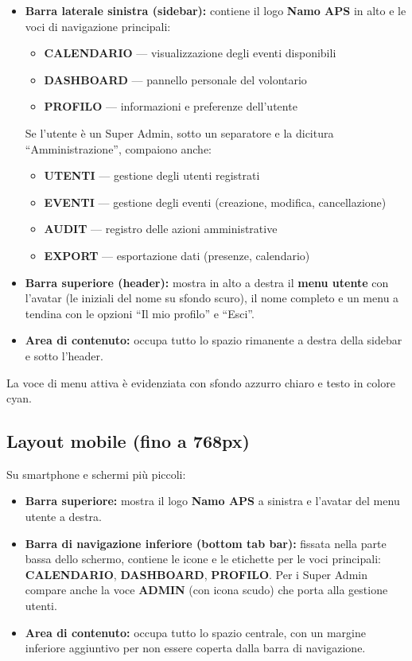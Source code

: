 \documentclass[a4paper,11pt,oneside]{book}
\newcommand{\namoaps}{\textbf{Namo APS}}
\newcommand{\menuitem}[1]{\textsf{\textbf{#1}}}
\begin{document}
\begin{itemize}[leftmargin=1.5em]
  \item \textbf{Barra laterale sinistra (sidebar):} contiene il logo \namoaps{} in alto e le voci di navigazione principali:
    \begin{itemize}
      \item \menuitem{CALENDARIO} --- visualizzazione degli eventi disponibili
      \item \menuitem{DASHBOARD} --- pannello personale del volontario
      \item \menuitem{PROFILO} --- informazioni e preferenze dell'utente
    \end{itemize}
    Se l'utente \`e un Super Admin, sotto un separatore e la dicitura ``Amministrazione'', compaiono anche:
    \begin{itemize}
      \item \menuitem{UTENTI} --- gestione degli utenti registrati
      \item \menuitem{EVENTI} --- gestione degli eventi (creazione, modifica, cancellazione)
      \item \menuitem{AUDIT} --- registro delle azioni amministrative
      \item \menuitem{EXPORT} --- esportazione dati (presenze, calendario)
    \end{itemize}
  \item \textbf{Barra superiore (header):} mostra in alto a destra il \textbf{menu utente} con l'avatar (le iniziali del nome su sfondo scuro), il nome completo e un menu a tendina con le opzioni ``Il mio profilo'' e ``Esci''.
  \item \textbf{Area di contenuto:} occupa tutto lo spazio rimanente a destra della sidebar e sotto l'header.
\end{itemize}

La voce di menu attiva \`e evidenziata con sfondo azzurro chiaro e testo in colore \textcolor{namoCyan}{cyan}.

\subsection{Layout mobile (fino a 768px)}

Su smartphone e schermi pi\`u piccoli:

\begin{itemize}[leftmargin=1.5em]
  \item \textbf{Barra superiore:} mostra il logo \namoaps{} a sinistra e l'avatar del menu utente a destra.
  \item \textbf{Barra di navigazione inferiore (bottom tab bar):} fissata nella parte bassa dello schermo, contiene le icone e le etichette per le voci principali: \menuitem{CALENDARIO}, \menuitem{DASHBOARD}, \menuitem{PROFILO}. Per i Super Admin compare anche la voce \menuitem{ADMIN} (con icona scudo) che porta alla gestione utenti.
  \item \textbf{Area di contenuto:} occupa tutto lo spazio centrale, con un margine inferiore aggiuntivo per non essere coperta dalla barra di navigazione.
\end{itemize}
\end{document}
